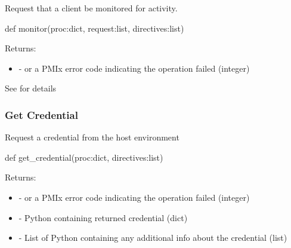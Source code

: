\summary

Request that a client be monitored for activity.

\format

\pyspecificstart
\begin{codepar}
def monitor(proc:dict, request:list, directives:list)
\end{codepar}
\pyspecificend

\begin{arglist}
\end{arglist}

Returns:
\begin{itemize}
    \item {} -  or a \ac{PMIx} error code indicating the operation failed (integer)
\end{itemize}

See  for details


\subsubsection{Get Credential}

\summary

Request a credential from the host environment

\format

\pyspecificstart
\begin{codepar}
def get_credential(proc:dict, directives:list)
\end{codepar}
\pyspecificend

\begin{arglist}
\end{arglist}

Returns:
\begin{itemize}
    \item {} -  or a \ac{PMIx} error code indicating the operation failed (integer)
    \item {} - Python  containing returned credential (dict)
    \item {} - List of Python  containing any additional info about the credential (list)
\end{itemize}

